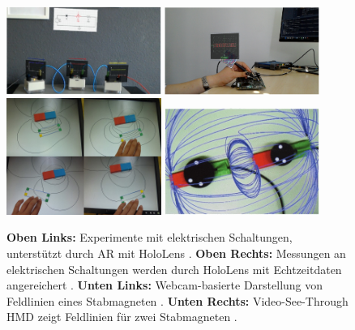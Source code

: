 \begin{figure}[h!]
	\centering
	\includegraphics[width=0.45\textwidth]{images/Amiraslanov18.png}
	\hspace{0.05cm}
	\includegraphics[width=0.45\textwidth]{images/Javaheri18.png}
	\vspace{0.05cm}
	\includegraphics[width=0.45\textwidth]{images/Matsutomo13.jpg}
	\hspace{0.05cm}
	\includegraphics[width=0.45\textwidth]{images/Mannuss11.jpg}
	\caption{\textbf{Oben Links:} Experimente mit elektrischen Schaltungen, unterstützt durch AR mit HoloLens \cite{Amiraslanov18}. \textbf{Oben Rechts:} Messungen an elektrischen Schaltungen werden durch HoloLens mit Echtzeitdaten angereichert \cite{Javaheri18}. \textbf{Unten Links:} Webcam-basierte Darstellung von Feldlinien eines Stabmagneten \cite{Matsutomo13}. \textbf{Unten Rechts:} Video-See-Through HMD zeigt Feldlinien für zwei Stabmagneten \cite{Mannuss11}.}
	\label{img:paper-collection}
\end{figure}

